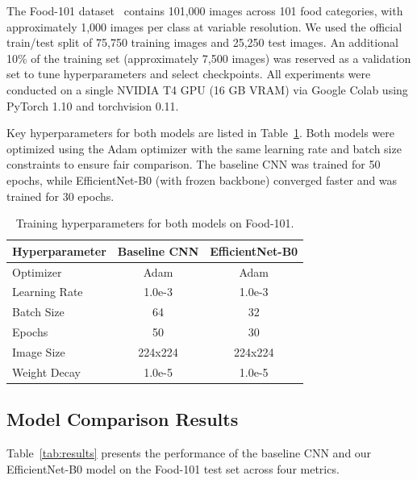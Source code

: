 \documentclass{article}
\begin{document}
The Food-101 dataset~\citep{bossard2014food101} contains 101,000 images across
101 food categories, with approximately 1,000 images per class at variable resolution.
We used the official train/test split of 75,750 training images and 25,250 test images.
An additional 10\% of the training set (approximately 7,500 images) was reserved as a
validation set to tune hyperparameters and select checkpoints. All experiments were conducted
on a single NVIDIA T4 GPU (16 GB VRAM) via Google Colab using PyTorch 1.10 and torchvision 0.11.

Key hyperparameters for both models are listed in Table~\ref{tab:hyperparams}.
Both models were optimized using the Adam optimizer with the same learning rate and batch
size constraints to ensure fair comparison. The baseline CNN was trained for 50 epochs,
while EfficientNet-B0 (with frozen backbone) converged faster and was trained for 30 epochs.

\begin{table}[h]
    \caption{Training hyperparameters for both models on Food-101.}
    \label{tab:hyperparams}
    \centering
    \begin{tabular}{lcc}
        \toprule
        Hyperparameter & Baseline CNN & EfficientNet-B0 \\
        \midrule
        Optimizer      & Adam         & Adam \\
        Learning Rate  & 1.0e-3       & 1.0e-3 \\
        Batch Size     & 64           & 32 \\
        Epochs         & 50           & 30 \\
        Image Size     & 224x224      & 224x224 \\
        Weight Decay   & 1.0e-5       & 1.0e-5 \\
        \bottomrule
    \end{tabular}
\end{table}

\subsection{Model Comparison Results}

Table~\ref{tab:results} presents the performance of the baseline CNN and our
EfficientNet-B0 model on the Food-101 test set across four metrics.
\end{document}
